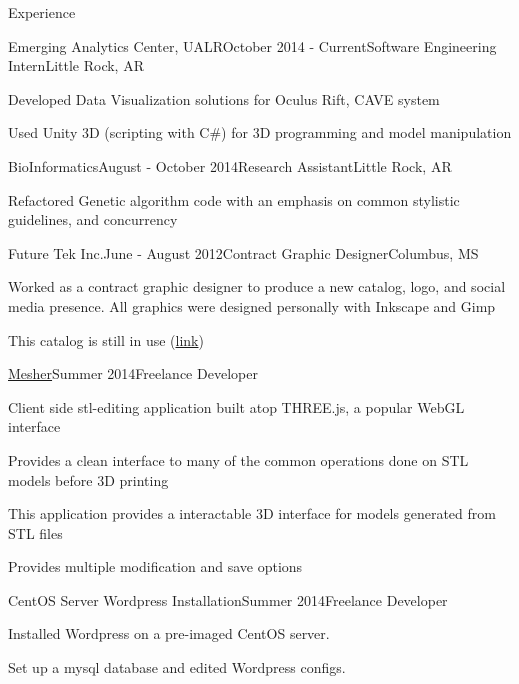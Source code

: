\documentclass{resume} %
\begin{document}
\begin{rSection}{Experience}

\begin{rSubsection}{Emerging Analytics Center, UALR}{October 2014 - Current}{Software Engineering Intern}{Little Rock, AR}

	\item Developed Data Visualization solutions for Oculus Rift, CAVE system
	\item Used Unity 3D (scripting with C\#) for 3D programming and model manipulation
\end{rSubsection}

\begin{rSubsection}{BioInformatics}{August - October 2014}{Research Assistant}{Little Rock, AR}

	\item Refactored Genetic algorithm code with an emphasis on common stylistic guidelines, and concurrency
\end{rSubsection}

\begin{rSubsection}{Future Tek Inc.}{June - August 2012}{Contract Graphic Designer}{Columbus, MS}

	\item Worked as a contract graphic designer to produce a new catalog, logo, and social media presence. All graphics were designed personally with Inkscape and Gimp
	\item This catalog is still in use (\href{http://www.futuretekinc.com/wp-content/uploads/2014/08/Future-Tek-Catalog.pdf}{link})
\end{rSubsection}

\begin{rSubsection}{\href{http://github.com/cptaffe/Mesher}{Mesher}}{Summer 2014}{Freelance Developer}{}

	\item Client side stl-editing application built atop THREE.js, a popular WebGL interface
	\item Provides a clean interface to many of the common operations done on STL models before 3D printing
	\item This application provides a interactable 3D interface for models generated from STL files
	\item Provides multiple modification and save options
\end{rSubsection}

\begin{rSubsection}{CentOS Server Wordpress Installation}{Summer 2014}{Freelance Developer}{}

	\item Installed Wordpress on a pre-imaged CentOS server.
	\item Set up a mysql database and edited Wordpress configs.
\end{rSubsection}

\end{rSection}
\end{document}
